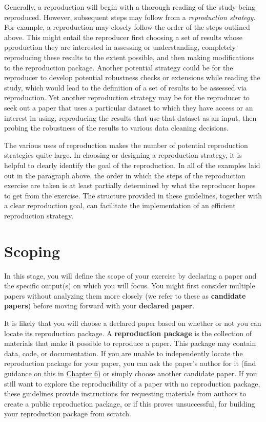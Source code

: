 \documentclass[]{book}
\begin{document}
Generally, a reproduction will begin with a thorough reading of the study being reproduced. However, subsequent steps may follow from a \emph{reproduction strategy}. For example, a reproduction may closely follow the order of the steps outlined above. This might entail the reproducer first choosing a set of results whose pproduction they are interested in assessing or understanding, completely reproducing these results to the extent possible, and then making modifications to the reproduction package. Another potential strategy could be for the reproducer to develop potential robustness checks or extensions while reading the study, which would lead to the definition of a set of results to be assessed via reproduction. Yet another reproduction strategy may be for the reproducer to seek out a paper that uses a particular dataset to which they have access or an interest in using, reproducing the results that use that dataset as an input, then probing the robustness of the results to various data cleaning decisions.

The various uses of reproduction makes the number of potential reproduction strategies quite large. In choosing or designing a reproduction strategy, it is helpful to clearly identify the goal of the reproduction. In all of the examples laid out in the paragraph above, the order in which the steps of the reproduction exercise are taken is at least partially determined by what the reproducer hopes to get from the exercise. The structure provided in these guidelines, together with a clear reproduction goal, can facilitate the implementation of an efficient reproduction strategy.

\hypertarget{scoping}{%
\chapter{Scoping}\label{scoping}}

In this stage, you will define the scope of your exercise by declaring a paper and the specific output(s) on which you will focus. You might first consider multiple papers without analyzing them more closely (we refer to these as \textbf{candidate papers}) before moving forward with your \textbf{declared paper}.

It is likely that you will choose a declared paper based on whether or not you can locate its reproduction package. A \textbf{reproduction package} is the collection of materials that make it possible to reproduce a paper. This package may contain data, code, or documentation. If you are unable to independently locate the reproduction package for your paper, you can ask the paper's author for it (find guidance on this in \href{https://bitss.github.io/ACRE/guidance-for-a-constructive-exchange-between-reproducers-and-original-authors.html}{Chapter 6}) or simply choose another candidate paper. If you still want to explore the reproducibility of a paper with no reproduction package, these guidelines provide instructions for requesting materials from authors to create a public reproduction package, or if this proves unsuccessful, for building your reproduction package from scratch.
\end{document}
